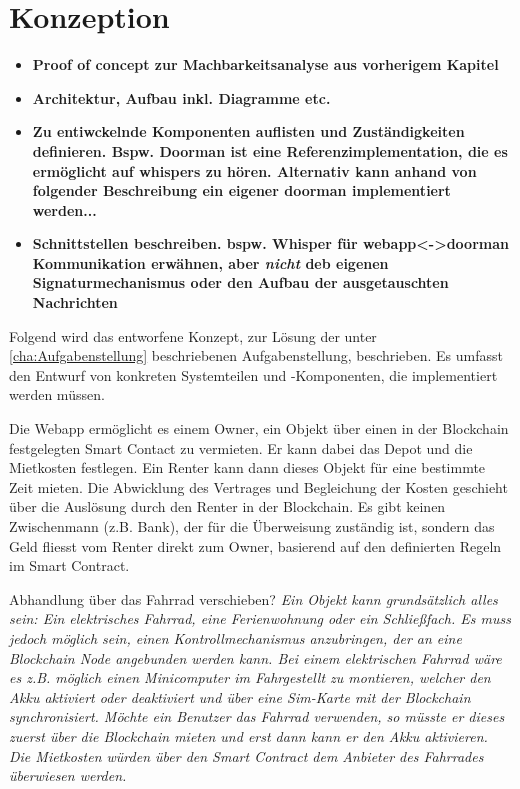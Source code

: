 \section{Konzeption}
\label{sec:Konzeption}
\begin{itemize}
    \item \textbf{Proof of concept zur Machbarkeitsanalyse aus vorherigem Kapitel}
    \item \textbf{Architektur, Aufbau inkl. Diagramme etc.}
    \item \textbf{Zu entiwckelnde Komponenten auflisten und Zuständigkeiten definieren. Bspw. Doorman ist eine Referenzimplementation, die es ermöglicht auf whispers zu hören. Alternativ kann anhand von folgender Beschreibung ein eigener doorman implementiert werden...}
    \item \textbf{Schnittstellen beschreiben. bspw. Whisper für webapp<->doorman Kommunikation erwähnen, aber \emph{nicht} deb eigenen Signaturmechanismus oder den Aufbau der ausgetauschten Nachrichten}
\end{itemize}

Folgend wird das entworfene Konzept, zur Lösung der unter \ref{cha:Aufgabenstellung} beschriebenen Aufgabenstellung, beschrieben. Es umfasst den Entwurf von konkreten Systemteilen und -Komponenten, die implementiert werden müssen.

Die Webapp ermöglicht es einem Owner, ein Objekt über einen in der Blockchain festgelegten Smart Contact zu vermieten. Er kann dabei das Depot und die Mietkosten festlegen. Ein Renter kann dann dieses Objekt für eine bestimmte Zeit mieten. Die Abwicklung des Vertrages und Begleichung der Kosten geschieht über die Auslösung durch den Renter in der Blockchain. Es gibt keinen Zwischenmann (z.B. Bank), der für die Überweisung zuständig ist, sondern das Geld fliesst vom Renter direkt zum Owner, basierend auf den definierten Regeln im Smart Contract.

Abhandlung über das Fahrrad verschieben? \emph{Ein Objekt kann grundsätzlich alles sein: Ein elektrisches Fahrrad, eine Ferienwohnung oder ein Schließfach. Es muss jedoch möglich sein, einen Kontrollmechanismus anzubringen, der an eine Blockchain Node angebunden werden kann. Bei einem elektrischen Fahrrad wäre es z.B. möglich einen Minicomputer im Fahrgestellt zu montieren, welcher den Akku aktiviert oder deaktiviert und über eine Sim-Karte mit der Blockchain synchronisiert. Möchte ein Benutzer das Fahrrad verwenden, so müsste er dieses zuerst über die Blockchain mieten und erst dann kann er den Akku aktivieren. Die Mietkosten würden über den Smart Contract dem Anbieter des Fahrrades überwiesen werden.}


